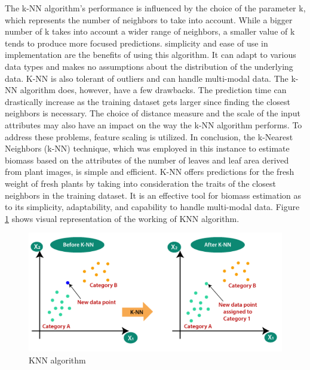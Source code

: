 \documentclass[a4paper,12pt]{report}%
\renewcommand{\\}{\vspace*{0.5\baselineskip} \newline}
\begin{document}
\noindent The k-NN algorithm's performance is influenced by the choice of the parameter k, which represents the number of neighbors to take into account. While a bigger number of k takes into account a wider range of neighbors, a smaller value of k tends to produce more focused predictions. 
simplicity and ease of use in implementation are the benefits of using this algorithm. It can adapt to various data types and makes no assumptions about the distribution of the underlying data. K-NN is also tolerant of outliers and can handle multi-modal data.
The k-NN algorithm does, however, have a few drawbacks. The prediction time can drastically increase as the training dataset gets larger since finding the closest neighbors is necessary. The choice of distance measure and the scale of the input attributes may also have an impact on the way the k-NN algorithm performs. To address these problems, feature scaling is utilized.
In conclusion, the k-Nearest Neighbors (k-NN) technique, which was employed in this instance to estimate biomass based on the attributes of the number of leaves and leaf area derived from plant images, is simple and efficient. K-NN offers predictions for the fresh weight of fresh plants by taking into consideration the traits of the closest neighbors in the training dataset. It is an effective tool for biomass estimation as to its simplicity, adaptability, and capability to handle multi-modal data. Figure \ref{KNN algorithm} shows visual representation of the working of KNN algorithm. 

\begin{figure}[h]
\centering
	\includegraphics[scale=0.95]{images/knn.png}\\
	\begin{footnotesize}
		\caption{KNN algorithm \cite{30}}
		\label{KNN algorithm}
	\end{footnotesize}
\end{figure}
\end{document}
